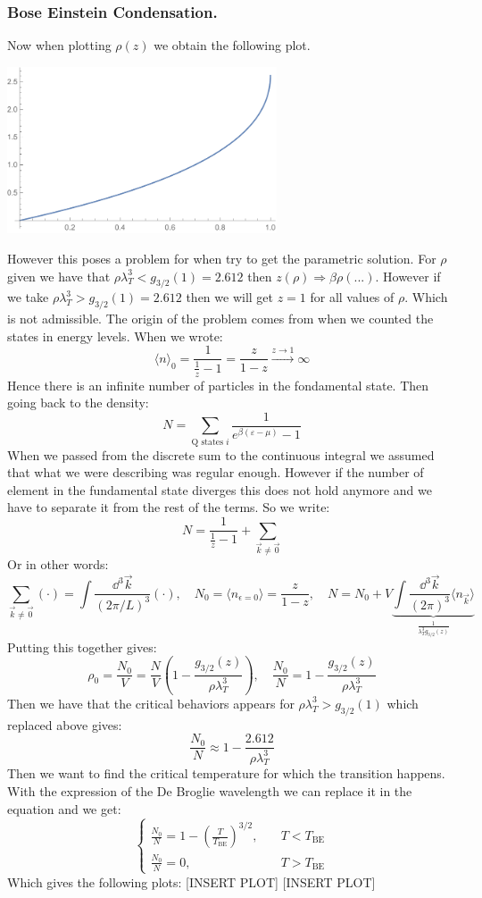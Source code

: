 \documentclass[10pt,a4paper]{book}
\begin{document}
\subsubsection{Bose Einstein Condensation.}
Now when plotting $\rho(z)$ we obtain the following plot.
\begin{center}
\includegraphics[width = 0.6\textwidth]{graphs/rhocondensation}
\end{center}
However this poses a problem for when try to get the parametric solution. For $\rho$ given we have that $\rho \lambda_T^3 < g_{3/2}(1) = 2.612$ then $z(\rho) \Rightarrow \beta \rho(...)$. However if we take $\rho \lambda_T^3 > g_{3/2}(1) = 2.612$ then we will get $z = 1$ for all values of $\rho$. Which is not admissible. The origin of the problem comes from when we counted the states in energy levels. When we wrote:
\[
\langle n \rangle_0 = \frac{1}{\frac{1}{z} - 1} = \frac{z}{1 - z} \stackrel{z \to 1}{\longrightarrow} \infty
\]
Hence there is an infinite number of particles in the fondamental state. Then going back to the density:
\[
N = \sum_{\text{Q states } i} \frac{1}{e^{\beta(\varepsilon - \mu)} - 1} 
\]
When we passed from the discrete sum to the continuous integral we assumed that what we were describing was regular enough. However if the number of element in the fundamental state diverges this does not hold anymore and we have to separate it from the rest of the terms. So we write:
\[
N = \frac{1}{\frac{1}{z} - 1} + \sum_{\vec{k} \neq \vec{0}}
\]
Or in other words:
\[
\sum_{\vec{k} \neq \vec{0}} \left( \cdot \right) = \int \frac{\dd^3 \vec{k}}{\left(2 \pi /L\right)^3} \left( \cdot \right), \quad N_0 = \langle n_{\epsilon = 0} \rangle = \frac{z}{1 - z}, \quad N = N_0 + V \underbrace{\int \frac{\dd^3 \vec{k}}{(2 \pi)^3} \langle n_{\vec{k}} \rangle}_{\frac{1}{\lambda_T^3 g_{3/2} (z)}}
\]
Putting this together gives:
\[
\rho_0 = \frac{N_0}{V} = \frac{N}{V}\left(1 - \frac{g_{3/2}(z)}{\rho \lambda_T^3}\right), \quad  \frac{N_0}{N} = 1 - \frac{g_{3/2}(z)}{\rho \lambda_T^3}
\]
Then we have that the critical behaviors appears for $\rho \lambda_T^3 > g_{3/2}(1)$ which replaced above gives:
\[
\frac{N_0}{N} \approx 1 - \frac{2.612}{\rho \lambda_T^3}
\]
Then we want to find the critical temperature for which the transition happens. With the expression of the De Broglie wavelength we can replace it in the equation and we get:
\[
\begin{cases}
\frac{N_0}{N} = 1 - \left(\frac{T}{T_\text{BE}}\right)^{3/2}, \quad &T < T_\text{BE}\\
\frac{N_0}{N} = 0, &T > T_\text{BE}
\end{cases}
\]
Which gives the following plots:
[INSERT PLOT] [INSERT PLOT]
\end{document}
